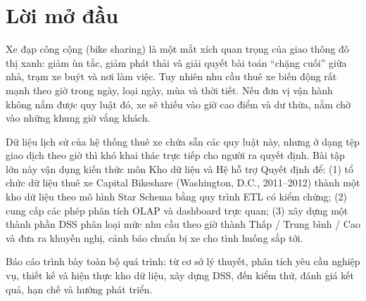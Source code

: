 \section*{Lời mở đầu}
Xe đạp công cộng (bike sharing) là một mắt xích quan trọng của giao thông đô thị xanh: giảm ùn tắc, giảm phát thải và giải quyết bài toán ``chặng cuối'' giữa nhà, trạm xe buýt và nơi làm việc. Tuy nhiên nhu cầu thuê xe biến động rất mạnh theo giờ trong ngày, loại ngày, mùa và thời tiết. Nếu đơn vị vận hành không nắm được quy luật đó, xe sẽ thiếu vào giờ cao điểm và dư thừa, nằm chờ vào những khung giờ vắng khách.

Dữ liệu lịch sử của hệ thống thuê xe chứa sẵn các quy luật này, nhưng ở dạng tệp giao dịch theo giờ thì khó khai thác trực tiếp cho người ra quyết định. Bài tập lớn này vận dụng kiến thức môn Kho dữ liệu và Hệ hỗ trợ Quyết định để: (1) tổ chức dữ liệu thuê xe Capital Bikeshare (Washington, D.C., 2011--2012) thành một kho dữ liệu theo mô hình Star Schema bằng quy trình ETL có kiểm chứng; (2) cung cấp các phép phân tích OLAP và dashboard trực quan; (3) xây dựng một thành phần DSS phân loại mức nhu cầu theo giờ thành Thấp / Trung bình / Cao và đưa ra khuyến nghị, cảnh báo chuẩn bị xe cho tình huống sắp tới.

Báo cáo trình bày toàn bộ quá trình: từ cơ sở lý thuyết, phân tích yêu cầu nghiệp vụ, thiết kế và hiện thực kho dữ liệu, xây dựng DSS, đến kiểm thử, đánh giá kết quả, hạn chế và hướng phát triển.
